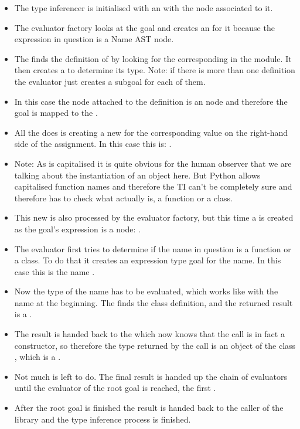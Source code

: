 \documentclass[12pt,halfparskip,DIV11,BCOR10mm]{scrreprt}
\begin{document}
\begin{itemize}
    \item The type inferencer is initialised with an  with the node  associated to it.
    \item The evaluator factory looks at the goal and creates an  for it because the expression in question is a Name AST node.
    \item The  finds the definition of  by looking for the corresponding  in the module. It then creates a  to determine its type. Note: if there is more than one definition the evaluator just creates a subgoal for each of them.
    \item In this case the node attached to the definition is an  node and therefore the goal is mapped to the .
    \item All the  does is creating a new  for the corresponding value on the right-hand side of the assignment. In this case this is: .
    \item Note: As  is capitalised it is quite obvious for the human observer that we are talking about the instantiation of an object here. But Python allows capitalised function names and therefore the TI can't be completely sure and therefore has to check what  actually is, a function or a class.
    \item This new  is also processed by the evaluator factory, but this time a  is created as the goal's expression is a  node: .
    \item The evaluator first tries to determine if the name in question is a function or a class. To do that it creates an expression type goal for the name. In this case this is the name .
    \item Now the type of the name  has to be evaluated, which works like with the  name at the beginning. The  finds the class definition, and the returned result is a .
    \item The result is handed back to the  which now knows that the call is in fact a constructor, so therefore the type returned by the call is an object of the class , which is a .
    \item Not much is left to do. The final result is handed up the chain of evaluators until the evaluator of the root goal is reached, the first .
    \item After the root goal is finished the result is handed back to the caller of the library and the type inference process is finished.
\end{itemize}
\end{document}
